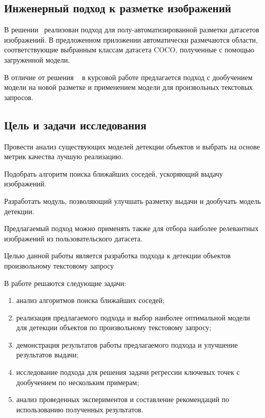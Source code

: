 \documentclass[a4paper,14pt]{article}
\begin{document}

    \subsection{Инженерный подход к разметке изображений}

    В решении~\cite{AnnoMage} реализован подход для полу-автоматизированной разметки датасетов изображений.
    В предложенном приложении автоматически размечаются области, соответствующие выбранным классам датасета COCO, полученные с помощью загруженной модели.

    В отличие от решения ~\cite{AnnoMage} в курсовой работе предлагается подход с дообучением модели на новой разметке и применением модели для произвольных текстовых запросов.

    \subsection{Цель и задачи исследования}
    
    Провести анализ существующих моделей детекции объектов и выбрать на основе метрик качества лучшую реализацию.
    
    Подобрать алгоритм поиска ближайших соседей, ускоряющий выдачу изображений.
    
    Разработать модуль, позволяющий улучшать разметку выдачи и дообучать модель детекции.

    Предлагаемый подход можно применять также для отбора наиболее релевантных изображений из пользовательского датасета.
    
    Целью данной работы является разработка подхода к детекции объектов произвольному текстовому запросу

    В работе решаются следующие задачи:
    \begin{enumerate}
        [1)]
        \itemsep0em
        \item анализ алгоритмов поиска ближайших соседей;
        \item реализация предлагаемого подхода и выбор наиболее оптимальной модели для детекции объектов по произвольному текстовому запросу;
        \item демонстрация результатов работы предлагаемого подхода и улучшение результатов выдачи;
        \item исследование подхода для решения задачи регрессии ключевых точек с дообучением по нескольким примерам;
        \item анализ проведенных экспериментов и составление рекомендаций по использованию полученных результатов.
    \end{enumerate}
\end{document}
